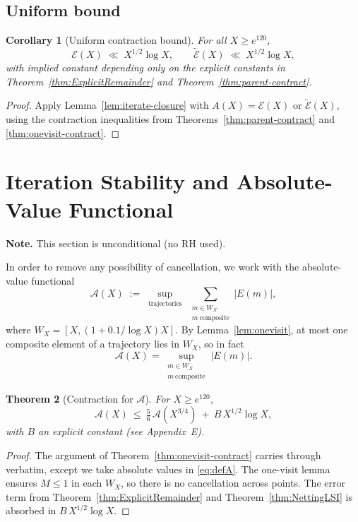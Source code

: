 \documentclass[11pt]{article}
\theoremstyle{plain}
\newtheorem{theorem}{Theorem}[section]
\newtheorem{corollary}[theorem]{Corollary}
\theoremstyle{definition}
\theoremstyle{remark}
\begin{document}
\subsection{Uniform bound}

\begin{corollary}[Uniform contraction bound]\label{cor:iteration}
For all $X \geq e^{120}$,
\[
\mathcal E(X) \;\ll\; X^{1/2}\log X,\qquad \widetilde{\mathcal E}(X) \;\ll\; X^{1/2}\log X,
\]
with implied constant depending only on the explicit constants in Theorem~\ref{thm:ExplicitRemainder} and Theorem~\ref{thm:parent-contract}.
\end{corollary}

\begin{proof}
Apply Lemma~\ref{lem:iterate-closure} with $A(X)=\mathcal E(X)$ or $\widetilde{\mathcal E}(X)$, using the contraction inequalities from Theorems~\ref{thm:parent-contract} and \ref{thm:onevisit-contract}.
\end{proof}



\section{Iteration Stability and Absolute-Value Functional}\label{sec:stability}
\noindent\textbf{Note.} This section is unconditional (no RH used).

In order to remove any possibility of cancellation, we work with the absolute-value functional
\begin{equation}\label{eq:defA}
\mathcal A(X) \;:=\; \sup_{\text{trajectories}} \;
\sum_{\substack{m\in W_X\\ m\ \text{composite}}} |E(m)|,
\end{equation}
where $W_X=[X,(1+0.1/\log X)X]$. By Lemma~\ref{lem:onevisit}, at most one composite element of a trajectory lies in $W_X$, so in fact
\[
\mathcal A(X)= \sup_{\substack{m\in W_X\\ m\ \text{composite}}}|E(m)|.
\]

\begin{theorem}[Contraction for $\mathcal A$]\label{thm:acontract}
For $X\ge e^{120}$,
\begin{equation}\label{eq:Acontract}
\mathcal A(X)\ \le\ \tfrac56\,\mathcal A(X^{3/4})\ +\ B\,X^{1/2}\log X,
\end{equation}
with $B$ an explicit constant (see Appendix~E).
\end{theorem}
\begin{proof}
The argument of Theorem~\ref{thm:onevisit-contract} carries through verbatim, except we take absolute values in \eqref{eq:defA}. The one-visit lemma ensures $M\le 1$ in each $W_X$, so there is no cancellation across points. The error term from Theorem~\ref{thm:ExplicitRemainder} and Theorem~\ref{thm:NettingLSI} is absorbed in $B\,X^{1/2}\log X$.
\end{proof}
\end{document}
